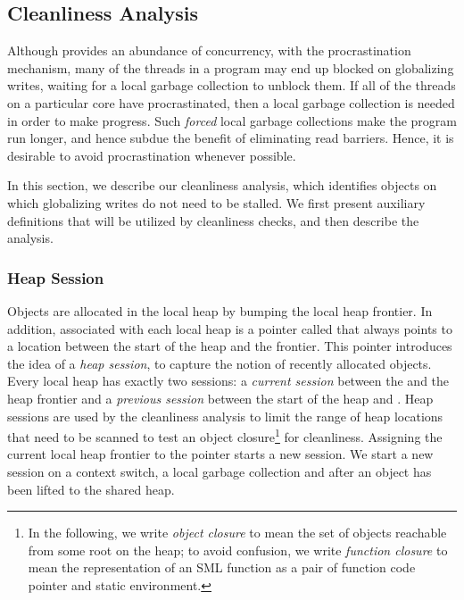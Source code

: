 \subsection{Cleanliness Analysis}
\label{sec:clean}

Although \acml provides an abundance of concurrency, with the procrastination
mechanism, many of the threads in a program may end up blocked on globalizing
writes, waiting for a local garbage collection to unblock them. If all of the
threads on a particular core have procrastinated, then a local garbage
collection is needed in order to make progress. Such \emph{forced} local
garbage collections make the program run longer, and hence subdue the benefit
of eliminating read barriers. Hence, it is desirable to avoid procrastination
whenever possible.

In this section, we describe our cleanliness analysis, which identifies objects
on which globalizing writes do not need to be stalled. We first present auxiliary
definitions that will be utilized by cleanliness checks, and then describe the
analysis.

\subsubsection{Heap Session}

Objects are allocated in the local heap by bumping the local heap frontier. In
addition, associated with each local heap is a pointer called 
that always points to a location between the start of the heap and the
frontier. This pointer introduces the idea of a \emph{heap session}, to capture
the notion of recently allocated objects. Every local heap has exactly two
sessions: a \emph{current session} between the  and the heap
frontier and a \emph{previous session} between the start of the heap and
. Heap sessions are used by the cleanliness analysis to limit
the range of heap locations that need to be scanned to test an object
closure\footnote{In the following, we write \emph{object closure} to mean the
set of objects reachable from some root on the heap; to avoid confusion, we
write \emph{function closure} to mean the representation of an SML function as
a pair of function code pointer and static environment.} for cleanliness.
Assigning the current local heap frontier to the  pointer
starts a new session. We start a new session on a context switch, a local
garbage collection and after an object has been lifted to the shared heap.

